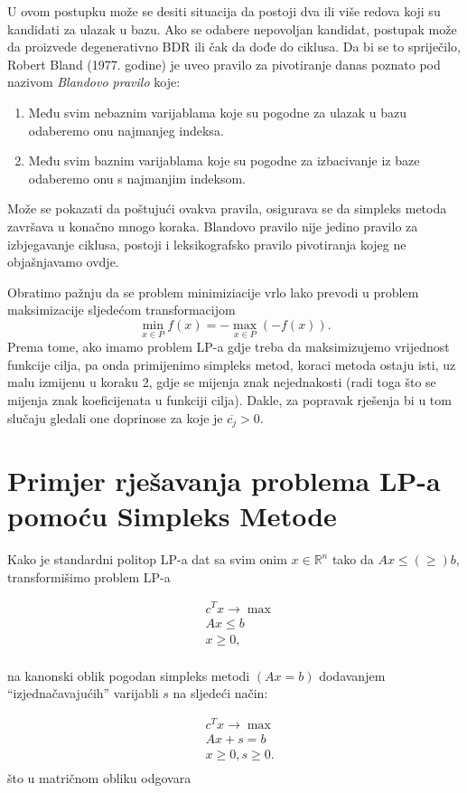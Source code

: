 \documentclass[a4paper, utf8, 11pt, colorlinks]{book}
\begin{document}
U ovom postupku  može se desiti situacija da postoji dva ili više redova koji su kandidati za ulazak u bazu. Ako se odabere nepovoljan kandidat, postupak može da proizvede degenerativno BDR ili čak da dođe do ciklusa. 
Da bi se to spriječilo, Robert Bland (1977. godine) je uveo pravilo za pivotiranje danas poznato pod
nazivom \emph{Blandovo pravilo} koje:
\begin{enumerate}
	\item   Među svim nebaznim varijablama koje su pogodne za ulazak u bazu odaberemo onu najmanjeg indeksa. 
    \item Među svim baznim varijablama koje su pogodne za izbacivanje iz baze odaberemo onu s najmanjim indeksom.
\end{enumerate}
Može se pokazati da poštujući ovakva pravila, osigurava se da simpleks metoda  završava u konačno mnogo koraka. Blandovo pravilo nije jedino pravilo za izbjegavanje ciklusa, postoji i leksikografsko pravilo pivotiranja kojeg ne objašnjavamo ovdje.  

Obratimo pažnju da se problem minimiziacije vrlo lako prevodi u problem maksimizacije sljedećom transformacijom
$$ \min_{ x \in P} f(x) = - \max_{x \in P}(-f(x)).$$ 
Prema tome, ako imamo problem LP-a gdje treba da maksimizujemo vrijednost funkcije cilja, pa onda primijenimo simpleks metod, koraci metoda ostaju isti, uz malu izmijenu u koraku 2, gdje se mijenja znak nejednakosti (radi toga što se mijenja znak koeficijenata u funkciji cilja). Dakle, za popravak rješenja bi u tom slučaju gledali one doprinose za koje je $\overline{c_j} > 0$.

\section{Primjer rješavanja problema LP-a pomoću Simpleks Metode}
Kako je standardni politop LP-a dat sa svim onim $x \in \mathbb{R}^n$ tako da $Ax \leq (\geq) b$, transformišimo problem LP-a
 
  \begin{align}
    & c^T x \rightarrow \max \\
    & Ax \leq b \\
    & x \geq 0,\\
\end{align}
 
na kanonski oblik pogodan simpleks metodi $(A {x} = b)$ dodavanjem ``izjednačavajućih'' varijabli $s$ na sljedeći način:
 
\begin{align}
    & c^T x \rightarrow \max \\
    & Ax + s =  b \\
    & x \geq 0, s \geq 0. \\
\end{align}
što u matričnom obliku odgovara 
\end{document}
